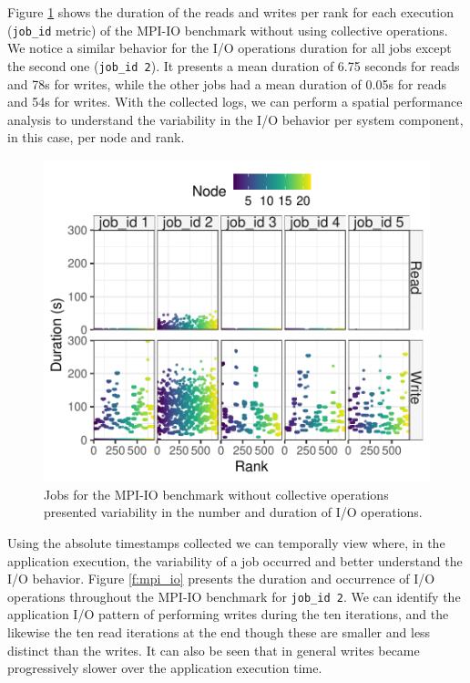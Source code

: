 Figure \ref{f:mpi_io_all} shows the duration of the reads and writes
per rank for each execution (\texttt{job\_id} metric) of the MPI-IO
benchmark without using collective operations. We notice a similar
behavior for the I/O operations duration for all jobs except the
second one (\texttt{job\_id 2}). It presents a mean duration of 6.75
seconds for reads and 78s for writes, while the other jobs had a mean
duration of 0.05s for reads and 54s for writes. With the collected
logs, we can perform a spatial performance analysis to understand the
variability in the I/O behavior per system component, in this case,
per node and rank.
      
\begin{figure}
	\centering
        \includegraphics[width=\linewidth]{figs/mpi_io_luster_no_coll_duration_allexperiments.pdf}
	\caption{Jobs for the MPI-IO benchmark without collective
          operations presented variability in the number and duration
          of I/O operations.}
	\label{f:mpi_io_all}
\end{figure}

Using the absolute timestamps collected we can temporally view
where, in the application execution, the variability of a job
occurred and better understand the I/O behavior. 
Figure \ref{f:mpi_io} presents the duration and occurrence of
I/O operations throughout the MPI-IO benchmark for \texttt{job\_id
  2}. We can identify the application I/O pattern of performing
writes during the ten iterations, and the likewise the ten read iterations at the end
though these are smaller and less distinct than the writes. 
It can also be seen that in general writes became progressively slower over
the application execution time.
      
